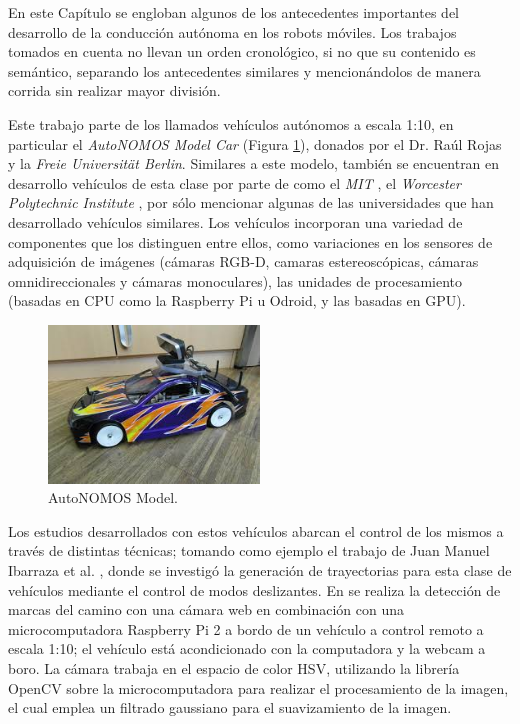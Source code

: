 En este Capítulo se engloban algunos de los antecedentes importantes del desarrollo de la conducción autónoma en los robots móviles. Los trabajos tomados en cuenta no llevan un orden cronológico, si no que su contenido es semántico, separando los antecedentes similares y mencionándolos de manera corrida sin realizar mayor división.
\par Este trabajo parte de los llamados vehículos autónomos a escala 1:10, en particular el {\it AutoNOMOS Model Car} (Figura \ref{fig:auto}), donados por el Dr. Raúl Rojas y la {\it Freie Universität Berlin}. Similares a este modelo, también se encuentran en desarrollo vehículos de esta clase por parte de como el {\it MIT} \cite{okellyF110OpenSource2019}, el {\it Worcester Polytechnic Institute} \cite{chenSelfdriving10Race2018}, por sólo mencionar algunas de las universidades que han desarrollado vehículos similares. Los vehículos incorporan una variedad de componentes que los distinguen entre ellos, como variaciones en los sensores de adquisición de imágenes (cámaras RGB-D, camaras estereoscópicas, cámaras omnidireccionales y cámaras monoculares), las unidades de procesamiento (basadas en CPU como la Raspberry Pi u Odroid, y las basadas en GPU).
\begin{figure}[htbp!]
	\centering
	\includegraphics[width=0.5\textwidth]{./Figuras/Mini}
	\caption{AutoNOMOS Model.}
	\label{fig:auto}
\end{figure}
\par Los estudios desarrollados con estos vehículos abarcan el control de los mismos a través de distintas técnicas; tomando como ejemplo el trabajo de Juan Manuel Ibarraza et al.  \cite{juanmanuelibarrazannathaGeneracionTrayectoriasPara}, donde se investigó la generación de trayectorias para esta clase de vehículos mediante el control de modos deslizantes. En \cite{StreetMarkDetection} se realiza la detección de marcas del camino con una cámara web en combinación con una microcomputadora Raspberry Pi 2 a bordo de un vehículo a control remoto a escala 1:10; el vehículo está acondicionado con la computadora y la webcam a boro. La cámara trabaja en el espacio de color HSV, utilizando la librería OpenCV sobre la microcomputadora para realizar el procesamiento de la imagen, el cual emplea un filtrado gaussiano para el suavizamiento de la imagen.
